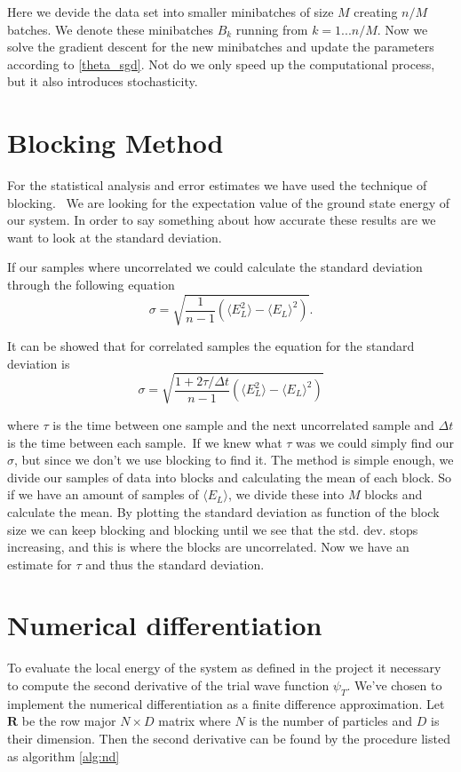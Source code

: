 Here we devide the data set into smaller minibatches of size $M$ creating $n/M$ batches. We denote these minibatches $B_k$ running from $k = 1...n/M$. Now we solve the gradient descent for the new minibatches and update the parameters according to \ref{theta_sgd}. Not do we only speed up the computational process, but it also introduces stochasticity. 


\section{Blocking Method}

For the statistical analysis and error estimates we have used the technique of blocking. \
We are looking for the expectation value of the ground state energy of our system. In order to say something about how accurate these results are we want to look at the standard deviation. 

If our samples where uncorrelated we could calculate the standard deviation through the following equation 
$$\sigma = \sqrt{\frac{1}{n - 1} \left(\langle E_L^2\rangle - \langle E_L \rangle^2\right)}.$$

It can be showed that for correlated samples the equation for the standard deviation is
$$\sigma = \sqrt{\frac{1 + 2 \tau / \Delta t}{n - 1} \left(\langle E_L^2\rangle - \langle E_L \rangle^2\right)}$$

where $\tau$ is the time between one sample and the next uncorrelated sample and $\Delta t$ is the time between each sample.\
If we knew what $\tau$ was we could simply find our $\sigma$, but since we don't we use blocking to find it. The method is simple enough, we divide our samples of data into blocks and calculating the mean of each block. So if we have an amount of samples of $\langle E_L \rangle$, we divide these into $M$ blocks and calculate the mean. By plotting the standard deviation as function of the block size we can keep blocking and blocking until we see that the std. dev. stops increasing, and this is where the blocks are uncorrelated. Now we have an estimate for $\tau$ and thus the standard deviation.


\section{Numerical differentiation}
To evaluate the local energy of the system as defined in the project it necessary to compute the second derivative of the trial wave function $\psi_T$. We've chosen to implement the numerical differentiation as a finite difference approximation. Let $\mathbf{R}$ be the row major $N \times D$ matrix where $N$ is the number of particles and $D$ is their dimension. Then the second derivative can be found by the procedure listed as algorithm \ref{alg:nd}

